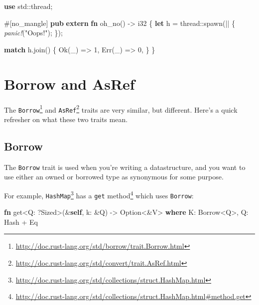 \documentclass[a4paper,]{book}
\newenvironment{Shaded}{\begin{snugshade}}{\end{snugshade}}
\newcommand{\KeywordTok}[1]{\textcolor[rgb]{0.13,0.29,0.53}{\textbf{{#1}}}}
\newcommand{\DataTypeTok}[1]{\textcolor[rgb]{0.13,0.29,0.53}{{#1}}}
\newcommand{\DecValTok}[1]{\textcolor[rgb]{0.00,0.00,0.81}{{#1}}}
\newcommand{\ConstantTok}[1]{\textcolor[rgb]{0.00,0.00,0.00}{{#1}}}
\newcommand{\StringTok}[1]{\textcolor[rgb]{0.31,0.60,0.02}{{#1}}}
\newcommand{\BuiltInTok}[1]{{#1}}
\newcommand{\PreprocessorTok}[1]{\textcolor[rgb]{0.56,0.35,0.01}{\textit{{#1}}}}
\newcommand{\AttributeTok}[1]{\textcolor[rgb]{0.77,0.63,0.00}{{#1}}}
\newcommand{\NormalTok}[1]{{#1}}
\renewcommand{\href}[2]{#2\footnote{\url{#1}}}
\begin{document}
\begin{Shaded}
\begin{Highlighting}[]
\KeywordTok{use} \NormalTok{std::thread;}

\AttributeTok{#[}\NormalTok{no_mangle}\AttributeTok{]}
\KeywordTok{pub} \KeywordTok{extern} \KeywordTok{fn} \NormalTok{oh_no() -> }\DataTypeTok{i32} \NormalTok{\{}
    \KeywordTok{let} \NormalTok{h = thread::spawn(|| \{}
        \PreprocessorTok{panic!}\NormalTok{(}\StringTok{"Oops!"}\NormalTok{);}
    \NormalTok{\});}

    \KeywordTok{match} \NormalTok{h.join() \{}
        \ConstantTok{Ok}\NormalTok{(_) => }\DecValTok{1}\NormalTok{,}
        \ConstantTok{Err}\NormalTok{(_) => }\DecValTok{0}\NormalTok{,}
    \NormalTok{\}}
\NormalTok{\}}
\end{Highlighting}
\end{Shaded}

\section{Borrow and AsRef}\label{sec--borrow-and-asref}

The
\href{http://doc.rust-lang.org/std/borrow/trait.Borrow.html}{\texttt{Borrow}}
and
\href{http://doc.rust-lang.org/std/convert/trait.AsRef.html}{\texttt{AsRef}}
traits are very similar, but different. Here's a quick refresher on what
these two traits mean.

\subsection{Borrow}\label{borrow}

The \texttt{Borrow} trait is used when you're writing a datastructure,
and you want to use either an owned or borrowed type as synonymous for
some purpose.

For example,
\href{http://doc.rust-lang.org/std/collections/struct.HashMap.html}{\texttt{HashMap}}
has a
\href{http://doc.rust-lang.org/std/collections/struct.HashMap.html\#method.get}{\texttt{get}
method} which uses \texttt{Borrow}:

\begin{Shaded}
\begin{Highlighting}[]
\KeywordTok{fn} \NormalTok{get<Q: ?}\BuiltInTok{Sized}\NormalTok{>(&}\KeywordTok{self}\NormalTok{, k: &Q) -> }\DataTypeTok{Option}\NormalTok{<&V>}
    \KeywordTok{where} \NormalTok{K: Borrow<Q>,}
          \NormalTok{Q: }\BuiltInTok{Hash} \NormalTok{+ }\BuiltInTok{Eq}
\end{Highlighting}
\end{Shaded}
\end{document}
